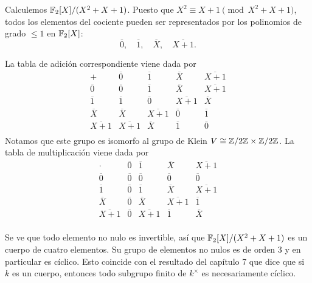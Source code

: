 \begin{ejemplo}
  Calculemos $\mathbb{F}_2 [X] / (X^2 + X + 1)$. Puesto que
  $X^2 \equiv X + 1 \pmod{X^2 + X + 1}$, todos los elementos del cociente pueden
  ser representados por los polinomios de grado $\le 1$ en $\mathbb{F}_2 [X]$:
  \[ \overline{0}, \quad \overline{1}, \quad
    \overline{X}, \quad \overline{X + 1}. \]

  La tabla de adición correspondiente viene dada por
    \[ \begin{array}{c|cccc}
         + & \overline{0} & \overline{1} & \overline{X} & \overline{X + 1} \\
         \hline
         \overline{0} & \overline{0} & \overline{1} & \overline{X} & \overline{X+1} \\
         \overline{1} & \overline{1} & \overline{0} & \overline{X + 1} & \overline{X} \\
         \overline{X} & \overline{X} & \overline{X + 1} & \overline{0} & \overline{1} \\
         \overline{X + 1} & \overline{X + 1} & \overline{X} & \overline{1} & \overline{0} \\
       \end{array} \]
 Notamos que este grupo es isomorfo al grupo de Klein $V \cong \mathbb{Z}/2\mathbb{Z} \times \mathbb{Z}/2\mathbb{Z}$. La tabla de multiplicación viene dada por
     \[ \begin{array}{c|cccc}
          \cdot & \overline{0} & \overline{1} & \overline{X} & \overline{X + 1} \\
          \hline
          \overline{0} & \overline{0} & \overline{0} & \overline{0} & \overline{0} \\
          \overline{1} & \overline{0} & \overline{1} & \overline{X} & \overline{X + 1} \\
          \overline{X} & \overline{0} & \overline{X } & \overline{X + 1} & \overline{1} \\
          \overline{X + 1} & \overline{0} & \overline{X + 1} & \overline{1} & \overline{X} \\
        \end{array} \]

  Se ve que todo elemento no nulo es invertible, así que
  $\mathbb{F}_2 [X] / (X^2 + X + 1)$ es un cuerpo de cuatro elementos. Su grupo
  de elementos no nulos es de orden $3$ y en particular es cíclico. Esto
  coincide con el resultado del capítulo 7 que dice que si $k$ es un cuerpo,
  entonces todo subgrupo finito de $k^\times$ es necesariamente cíclico.
\end{ejemplo}

